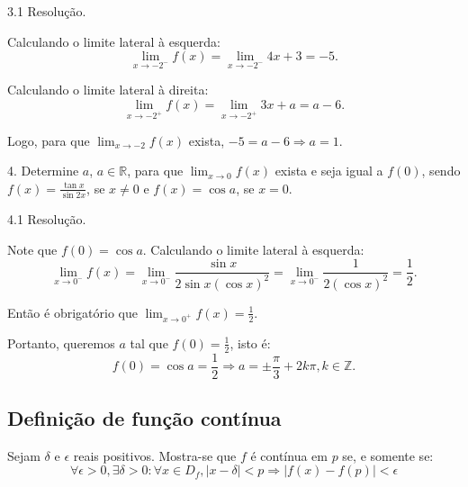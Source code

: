 \documentclass{article}
\begin{document}
{\begin{newpage}
\begin{flushleft}
\end{flushleft}
\par
\vspace{0.3cm}
\begin{flushleft}
3.1 Resolução.
\end{flushleft}
\par Calculando o limite lateral à esquerda:
\begin{equation*} \displaystyle{\lim_{x\to -2^{-}}} f(x) = \displaystyle{\lim_{x\to -2^{-}}} 4x + 3 = -5. \end{equation*}
\par Calculando o limite lateral à direita:
\begin{equation*} \displaystyle{\lim_{x\to -2^{+}}} f(x) = \displaystyle{\lim_{x\to -2^{+}}} 3x + a = a - 6. \end{equation*}
\par Logo, para que $\displaystyle{\lim_{x\to -2}} f(x)$ exista, $-5 = a - 6 \Rightarrow a = 1$.
\begin{flushleft}
4. Determine $a$, $a\in\mathbb{R}$, para que $\displaystyle{\lim_{x\to 0}} f(x)$ exista e seja igual a $f(0)$, sendo $f(x) = \displaystyle{\frac{\tan{x}}{\sin{2x}}}$, se $x\neq 0$ e $f(x) = \cos{a}$, se $x=0$.
\end{flushleft}
\begin{flushleft}
4.1 Resolução.
\end{flushleft}
\par Note que $f(0) = \cos{a}$. Calculando o limite lateral à esquerda:
\begin{equation*} \displaystyle{\lim_{x\to 0^{-}}} f(x) = \displaystyle{\lim_{x\to 0^{-}}} \frac{\sin{x}}{2\sin{x}(\cos{x})^2} = \displaystyle{\lim_{x\to 0^{-}}} \frac{1}{2(\cos{x})^2} = \frac{1}{2}. \end{equation*}
\par Então é obrigatório que $\displaystyle{\lim_{x\to 0^{+}}} f(x) = \frac{1}{2}$.
\par Portanto, queremos $a$ tal que $f(0) = \displaystyle{\frac{1}{2}}$, isto é:
$$f(0) = \cos{a} = \frac{1}{2} \Rightarrow a = \pm \frac{\pi}{3} + 2k\pi , k\in\mathbb{Z}.$$
\par
\vspace{0.3cm}
\subsection{Definição de função contínua}
\hspace{12pt} Sejam $\delta $ e $\epsilon $ reais positivos. Mostra-se que $f$ é contínua em $p$ se, e somente se:
\begin{equation*}\displaystyle{\forall \epsilon > 0 , \exists \delta > 0 : \forall x\in D_f , |x - \delta | < p \Rightarrow |f(x) - f(p)| < \epsilon }\end{equation*}
\par
\vspace{0.3cm}

\end{newpage}}
\end{document}
